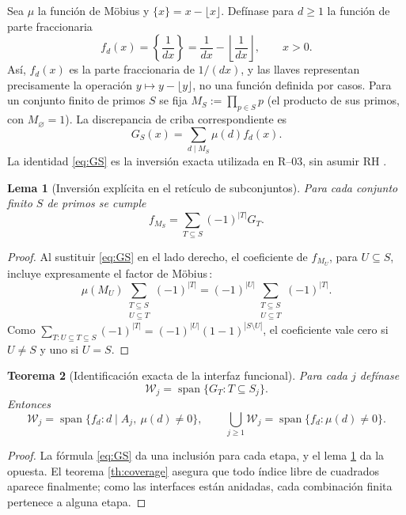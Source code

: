 \documentclass[11pt,a4paper]{article}
\theoremstyle{mine}
\newtheorem{teorema}{Teorema}[section]
\newtheorem{lema}[teorema]{Lema}
\theoremstyle{definition}
\newcommand{\WW}{\mathcal W}
\begin{document}
Sea $\mu$ la función de Möbius y $\{x\}=x-\lfloor x\rfloor$. Defínase para $d\ge1$ la función de parte fraccionaria
\begin{equation}\label{eq:fd}
f_d(x)=\left\{\frac{1}{dx}\right\}
=\frac{1}{dx}-\left\lfloor\frac{1}{dx}\right\rfloor,\qquad x>0.
\end{equation}
Así, $f_d(x)$ es la parte fraccionaria de $1/(dx)$, y las llaves representan precisamente la operación $y\mapsto y-\lfloor y\rfloor$, no una función definida por casos.
Para un conjunto finito de primos $S$ se fija $M_S:=\prod_{p\in S}p$ (el producto de sus primos, con $M_\varnothing=1$). La discrepancia de criba correspondiente es
\begin{equation}\label{eq:GS}
G_S(x)=\sum_{d\mid M_S}\mu(d) f_d(x).
\end{equation}
La identidad \eqref{eq:GS} es la inversión exacta utilizada en R--03, sin asumir RH \cite{R03}.

\begin{lema}[Inversión explícita en el retículo de subconjuntos]\label{le:mobinv}
Para cada conjunto finito $S$ de primos se cumple
\begin{equation}\label{eq:mobinv}
\boxed{\quad f_{M_S}=\sum_{T\subseteq S}(-1)^{|T|}G_T.\quad}
\end{equation}
\end{lema}
\begin{proof}
Al sustituir \eqref{eq:GS} en el lado derecho, el coeficiente de $f_{M_U}$, para $U\subseteq S$, incluye expresamente el factor de Möbius\,:
\[
\mu(M_U)\sum_{\substack{T\subseteq S\\U\subseteq T}}(-1)^{|T|}
=(-1)^{|U|}\sum_{\substack{T\subseteq S\\U\subseteq T}}(-1)^{|T|}.
\]
Como $\sum_{T:U\subseteq T\subseteq S}(-1)^{|T|}=(-1)^{|U|}(1-1)^{|S\setminus U|}$, el coeficiente vale cero si $U\ne S$ y uno si $U=S$.
\end{proof}

\begin{teorema}[Identificación exacta de la interfaz funcional]\label{th:spaces}
Para cada $j$ defínase
\begin{equation}\label{eq:W}
\WW_j=\operatorname{span}\{G_T:T\subseteq S_j\}.
\end{equation}
Entonces
\begin{equation}\label{eq:span}
\boxed{\ \WW_j=\operatorname{span}\{f_d:d\mid A_j,\ \mu(d)\ne0\},\qquad
\bigcup_{j\ge1}\WW_j=\operatorname{span}\{f_d:\mu(d)\ne0\}.\ }
\end{equation}
\end{teorema}
\begin{proof}
La fórmula \eqref{eq:GS} da una inclusión para cada etapa, y el lema \ref{le:mobinv} da la opuesta. El teorema \ref{th:coverage} asegura que todo índice libre de cuadrados aparece finalmente; como las interfaces están anidadas, cada combinación finita pertenece a alguna etapa.
\end{proof}
\end{document}
